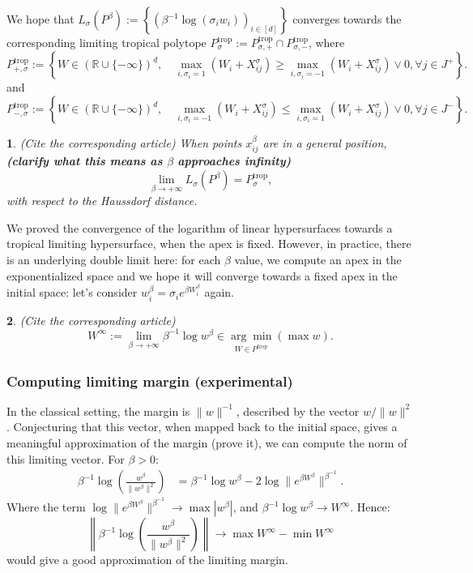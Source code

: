 \documentclass[oneside,english,a4paper]{amsart}
\numberwithin{equation}{section}
\numberwithin{figure}{section}
\theoremstyle{plain}
\newtheorem{thm}{\protect\theoremname}
\theoremstyle{definition}
\theoremstyle{plain}
\theoremstyle{remark}
\theoremstyle{plain}
\theoremstyle{definition}
\theoremstyle{definition}
\providecommand{\theoremname}{Theorem}
\begin{document}
We hope that $L_{\sigma}(P^{\beta}):=\left\{ (\beta^{-1}\log(\sigma_{i}w_{i}))_{i\in[d]}\right\} $
converges towards the corresponding limiting tropical polytope $P_{\sigma}^{\text{trop}}:=P_{\sigma,+}^{\text{trop}}\cap P_{\sigma,-}^{\text{trop}}$,
where 
\[
P_{+,\sigma}^{\text{trop}}:=\left\{ W\in(\mathbb{R}\cup\{-\infty\})^{d},\quad\max_{i,\sigma_{i}=1}(W_{i}+X_{ij}^{\sigma})\ge\max_{i,\sigma_{i}=-1}(W_{i}+X_{ij}^{\sigma})\vee0,\forall j\in J^{+}\right\} .
\]
and 
\[
P_{-,\sigma}^{\text{trop}}:=\left\{ W\in(\mathbb{R}\cup\{-\infty\})^{d},\quad\max_{i,\sigma_{i}=-1}(W_{i}+X_{ij}^{\sigma})\le\max_{i,\sigma_{i}=1}(W_{i}+X_{ij}^{\sigma})\vee0,\forall j\in J^{-}\right\} .
\]

\begin{thm}
(Cite the corresponding article) When points $x_{ij}^{\beta}$ are
in a general position, \textbf{(clarify what this means as $\beta$}
\textbf{approaches infinity)} 
\[
\lim_{\beta\rightarrow+\infty}L_{\sigma}(P^{\beta})=P_{\sigma}^{\text{trop}},
\]
with respect to the Haussdorf distance. 
\end{thm}

We proved the convergence of the logarithm of linear hypersurfaces
towards a tropical limiting hypersurface, when the apex is fixed.
However, in practice, there is an underlying double limit here: for
each $\beta$ value, we compute an apex in the exponentialized space
and we hope it will converge towards a fixed apex in the initial space:
let's consider $w_{i}^{\beta}=\sigma_{i}e^{\beta W_{i}^{\beta}}$
again. 
\begin{thm}
(Cite the corresponding article) 
\[
W^{\infty}:=\lim_{\beta\rightarrow+\infty}\beta^{-1}\log w^{\beta}\in\underset{W\in P^{\text{trop}}}{\arg\min}\left(\max w\right).
\]
\end{thm}


\subsubsection{Computing limiting margin (experimental)}

In the classical setting, the margin is $\lVert w\rVert^{-1}$, described
by the vector $w/\lVert w\rVert^{2}$. Conjecturing that this vector,
when mapped back to the initial space, gives a meaningful approximation
of the margin (prove it), we can compute the norm of this limiting
vector. For $\beta>0$: 
\begin{align*}
\beta^{-1}\log\left(\frac{w^{\beta}}{\lVert w^{\beta}\rVert^{2}}\right) & =\beta^{-1}\log w^{\beta}-2\log\lVert e^{\beta W^{\beta}}\rVert^{\beta^{-1}}.
\end{align*}
Where the term $\log\lVert e^{\beta W^{\beta}}\rVert^{\beta^{-1}}\rightarrow\max\left|w^{\beta}\right|$,
and $\beta^{-1}\log w^{\beta}\rightarrow W^{\infty}$. Hence: 
\[
\left\lVert \beta^{-1}\log\left(\frac{w^{\beta}}{\lVert w^{\beta}\rVert^{2}}\right)\right\rVert \longrightarrow\max W^{\infty}-\min W^{\infty}
\]
would give a good approximation of the limiting margin.

\newpage{} 

\end{document}
